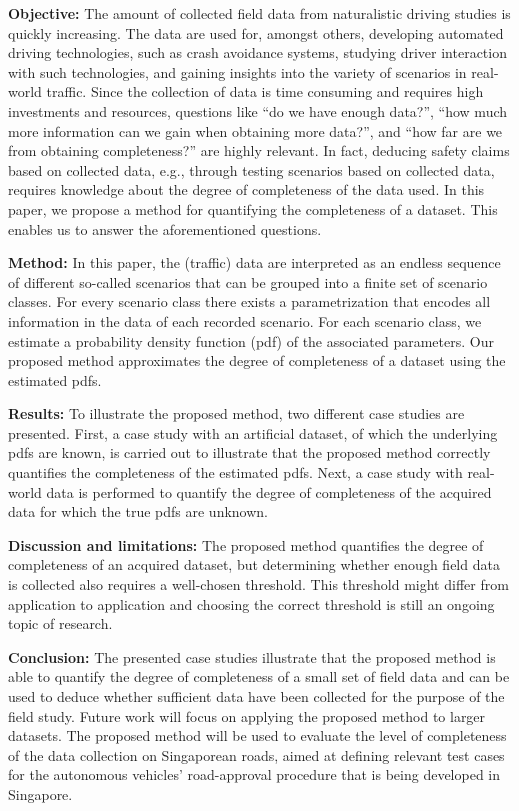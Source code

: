 \textbf{Objective:} The amount of collected field data from naturalistic driving studies is quickly increasing. The data are used for, amongst others, developing automated driving technologies, such as crash avoidance systems, studying driver interaction with such technologies, and gaining insights into the variety of scenarios in real-world traffic. Since the collection of data is time consuming and requires high investments and resources, questions like “do we have enough data?”, “how much more information can we gain when obtaining more data?”, and “how far are we from obtaining completeness?” are highly relevant. In fact, deducing safety claims based on collected data, e.g., through testing scenarios based on collected data, requires knowledge about the degree of completeness of the data used. In this paper, we propose a method for quantifying the completeness of a dataset. This enables us to answer the aforementioned questions.

\textbf{Method:} In this paper, the (traffic) data are interpreted as an endless sequence of different so-called scenarios that can be grouped into a finite set of scenario classes. For every scenario class there exists a parametrization that encodes all information in the data of each recorded scenario. For each scenario class, we estimate a probability density function (pdf) of the associated parameters. Our proposed method approximates the degree of completeness of a dataset using the estimated pdfs. 

\textbf{Results:} To illustrate the proposed method, two different case studies are presented. First, a case study with an artificial dataset, of which the underlying pdfs are known, is carried out to illustrate that the proposed method correctly quantifies the completeness of the estimated pdfs. Next, a case study with real-world data is performed to quantify the degree of completeness of the acquired data for which the true pdfs are unknown.

\textbf{Discussion and limitations:} The proposed method quantifies the degree of completeness of an acquired dataset, but determining whether enough field data is collected also requires a well-chosen threshold. This threshold might differ from application to application and choosing the correct threshold is still an ongoing topic of research.

\textbf{Conclusion:} The presented case studies illustrate that the proposed method is able to quantify the degree of completeness of a small set of field data and can be used to deduce whether sufficient data have been collected for the purpose of the field study. Future work will focus on applying the proposed method to larger datasets. The proposed method will be used to evaluate the level of completeness of the data collection on Singaporean roads, aimed at defining relevant test cases for the autonomous vehicles’ road-approval procedure that is being developed in Singapore.
